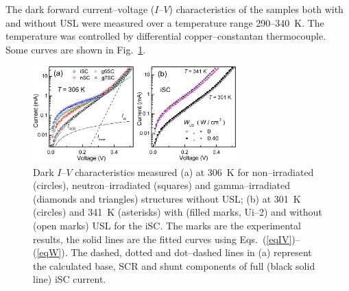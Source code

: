 \documentclass[aip,jap, amsmath,amssymb,reprint]{revtex4-1}
\begin{document}


The dark forward current--voltage ($I$--$V$) characteristics of the samples both with and without USL were measured over a temperature range 290--340~K.
The temperature was controlled by differential copper--constantan thermocouple.
Some curves are shown in Fig.~\ref{figIV}.


\begin{figure}
\includegraphics[width=0.7\textwidth]{fig_1ab}%
\caption{\label{figIV}
Dark $I$--$V$ characteristics measured (a) at 306~K for non--irradiated (circles), neutron--irradiated (squares) and gamma--irradiated (diamonds and triangles) structures without USL;
(b) at 301~K (circles) and 341~K (asterisks) with (filled marks, Ui--2) and without (open marks) USL for the iSC.
The marks are the experimental results, the solid lines are the fitted curves using Eqs.~(\ref{eqIV})--(\ref{eqW}).
The dashed, dotted and dot--dashed lines in (a) represent the calculated base, SCR and shunt components of full (black solid line) iSC current.
}%
\end{figure}
\end{document}
